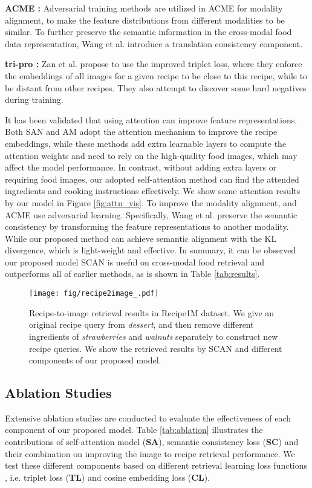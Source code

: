 \documentclass[journal]{IEEEtran}
\begin{document}
\textbf{ACME \cite{wang2019learning}:} Adversarial training methods are utilized in ACME for modality alignment, to make the feature distributions from different modalities to be similar. To further preserve the semantic information in the cross-modal food data representation, Wang et al. introduce a translation consistency component.

\textbf{tri-pro \cite{zan2020sentence}:} Zan et al. propose to use the improved triplet loss, where they enforce the embeddings of all images for a given recipe to be close to this recipe, while to be distant from other recipes. They also attempt to discover some hard negatives during training.

It has been validated that using attention can improve feature representations. Both SAN \cite{chen2017cross} and AM \cite{chen2018deep} adopt the attention mechanism to improve the recipe embeddings, while these methods add extra learnable layers to compute the attention weights and need to rely on the high-quality food images, which may affect the model performance. In contrast, without adding extra layers or requiring food images, our adopted self-attention method can find the attended ingredients and cooking instructions effectively. We show some attention results by our model in Figure \ref{fig:attn_vis}. To improve the modality alignment,  \cite{zhu2019r2gan} and ACME \cite{wang2019learning} use adversarial learning. Specifically, Wang et al. \cite{wang2019learning} preserve the semantic consistency by transforming the feature representations to another modality. While our proposed method can achieve semantic alignment with the KL divergence, which is light-weight and effective. In summary, it can be observed our proposed model SCAN is useful on cross-modal food retrieval and outperforms all of earlier methods, as is shown in Table \ref{tab:results}.


\begin{figure*}
\begin{center}
\texttt{[image: fig/recipe2image\_.pdf]}
\end{center}
   \caption{Recipe-to-image retrieval results in Recipe1M dataset. We give an original recipe query from \emph{dessert}, and then remove different ingredients of \emph{strawberries} and \emph{walnuts} separately to construct new recipe queries. We show the retrieved results by SCAN and different components of our proposed model.}
\label{fig:re2im}
\end{figure*}

\subsection{Ablation Studies}
Extensive ablation studies are conducted to evaluate the effectiveness of each component of our proposed model. Table \ref{tab:ablation} illustrates the contributions of self-attention model (\textbf{SA}), semantic consistency loss (\textbf{SC}) and their combination on improving the image to recipe retrieval performance. We test these different components based on different retrieval learning loss functions , i.e. triplet loss (\textbf{TL}) and cosine embedding loss (\textbf{CL}). 
\end{document}
